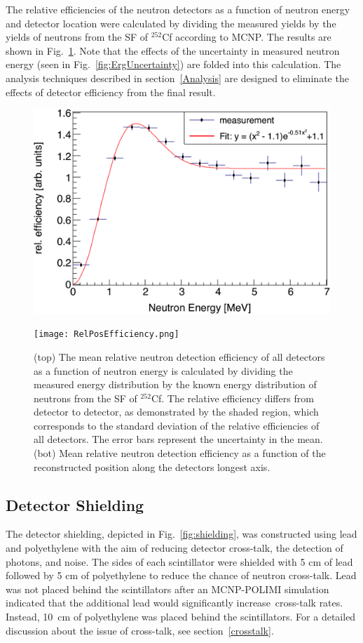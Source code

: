 The relative efficiencies of the neutron detectors as a function of neutron energy and detector location were calculated by dividing the measured yields by the yields of neutrons from the SF of $^{252}$Cf according to MCNP.
The results are shown in Fig.~\ref{fig:RelErgEfficiency}.
Note that the effects of the uncertainty in measured neutron energy (seen in Fig.~\ref{fig:ErgUncertainty}) are folded into this calculation.
The analysis techniques described in section~\ref{Analysis} are designed to eliminate the effects of detector efficiency from the final result.
\begin{figure}[]
    \centering
    \includegraphics[width = \figsize\textwidth]{RelErgEfficiency.png}
    \vspace{10cm}

     \texttt{[image: RelPosEfficiency.png]}
     
       \caption{(top) The mean relative neutron detection efficiency of all detectors as a function of neutron energy is calculated by dividing the measured energy distribution by the known energy distribution of neutrons from the SF of $^{252}$Cf. The relative efficiency differs from detector to detector, as demonstrated by the shaded region, which corresponds to the standard deviation of the relative efficiencies of all detectors. The error bars represent the uncertainty in the mean. (bot) Mean relative neutron detection efficiency as a function of the reconstructed position along the detectors longest axis. }
    \label{fig:RelErgEfficiency}
\end{figure}

\subsection{Detector Shielding}
\label{shielding}
The detector shielding, depicted in Fig.~\ref{fig:shielding}, was constructed using lead and polyethylene with the aim of reducing detector cross-talk, the detection of photons, and noise.
The sides of each scintillator were shielded with 5 cm of lead followed by 5 cm of polyethylene to reduce the chance of neutron cross-talk.
Lead was not placed behind the scintillators after an MCNP-POLIMI simulation indicated that the additional lead would significantly increase cross-talk rates.
Instead, 10~cm of polyethylene was placed behind the scintillators.
For a detailed discussion about the issue of cross-talk, see section~\ref{crosstalk}.

